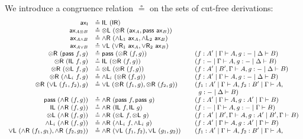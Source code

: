\documentclass[submission,copyright,creativecommons]{eptcs}
\theoremstyle{definition}
\newcommand{\tl}{\otimes \mathsf{L}}
\newcommand{\tr}{\otimes \mathsf{R}}
\newcommand{\pass}{\mathsf{pass}}
\newcommand{\unitl}{\mathsf{IL}}
\newcommand{\unitr}{\mathsf{IR}}
\newcommand{\andlone}{\land \mathsf{L}_{1}}
\newcommand{\andltwo}{\land \mathsf{L}_{2}}
\newcommand{\andli}{\land \mathsf{L}_{i}}
\newcommand{\andr}{\land \mathsf{R}}
\newcommand{\orl}{\lor \mathsf{L}}
\newcommand{\orrone}{\lor \mathsf{R}_{1}}
\newcommand{\orrtwo}{\lor \mathsf{R}_{2}}
\newcommand{\ax}{\mathsf{ax}}
\newcommand{\ot}{\otimes}
\newcommand{\I}{\mathsf{I}}
\begin{document}
We introduce a congruence relation $\circeq$ on the sets of cut-free derivations:
  \begin{equation}\label{fig:circeq}
  \small
  \begin{array}{rlll}
    \ax_{\I} &\circeq \unitl \text{ } (\unitr)
    \\
    \ax_{A \ot B} &\circeq \tl \text{ } (\tr \text{ } (\ax_{A} , \pass \text{ } \ax_{B}))
    \\
    \ax_{A \land B} &\circeq \andr \ (\andlone \ \ax_A , \andltwo \ \ax_B)
    \\
    \ax_{A \lor B} &\circeq \orl \ (\orrone \ \ax_A , \orrtwo \ \ax_B)
    \\
    \tr \text{ } (\pass \text{ } f, g) &\circeq \pass \text{ } (\tr \text{ } (f, g)) &&(f : A' \mid \Gamma \vdash A, g : {-} \mid \Delta \vdash B)
    \\
    \tr \text{ } (\unitl \text{ } f, g) &\circeq \unitl \text{ } (\tr \text{ } (f , g)) &&(f : {-} \mid \Gamma \vdash A , g : {-} \mid \Delta \vdash B)
    \\
    \tr \text{ } (\tl \text{ } f, g) &\circeq \tl \text{ } (\tr \text{ } (f , g)) &&(f : A' \mid B' , \Gamma \vdash A , g : {-} \mid \Delta \vdash B)
    \\
    \tr \ (\andli \ f , g) &\circeq \andli \ (\tr \ (f , g)) &&(f : A' \mid \Gamma \vdash A, g : - \mid \Delta \vdash B)
    \\
    \tr \ (\orl \ (f_1 , f_2) , g) &\circeq \orl \ (\tr \ (f_1 , g) , \tr \ (f_2 , g)) &&(f_1 : A' \mid \Gamma \vdash A , f_2 : B' \mid \Gamma \vdash A , \\
    & && \;\;g : - \mid \Delta \vdash B)
    \\
    \pass \ (\andr \ (f , g)) &\circeq  \andr \ (\pass \ f , \pass \ g) &&(f : A' \mid \Gamma \vdash A , g : A' \mid \Gamma \vdash B)
    \\
    \unitl \ (\andr \ (f , g)) &\circeq  \andr \ (\unitl \ f , \unitl \ g) &&(f : - \mid \Gamma \vdash A , g : - \mid \Gamma \vdash B)
    \\
    \tl \ (\andr \ (f , g)) &\circeq  \andr \ (\tl \ f , \tl \ g) &&(f : A' \mid B' , \Gamma \vdash A , g : A' \mid B' , \Gamma \vdash B)
    \\
    \andli \ (\andr \ (f , g)) &\circeq  \andr \ (\andli \ f , \andli \ g) &&(f : A' \mid \Gamma \vdash A , g : A' \mid \Gamma \vdash B)
    \\
    \orl \ (\andr \ (f_1 , g_1) , \andr \ (f_2 , g_2)) &\circeq  \andr \ (\orl \ (f_1 , f_2) , \orl \ (g_1 , g_2)) &&(f_1 : A' \mid \Gamma \vdash A , f_2 : B' \mid \Gamma \vdash A , 

\end{array}
\end{equation}
\end{document}
